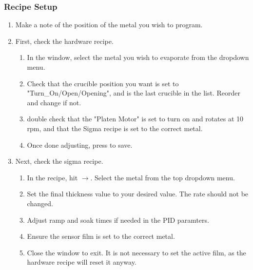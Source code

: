 \subsubsection{Recipe Setup}
\begin{enumerate}[resume]
\item Make a note of the position of the metal you wish to program.
\item First, check the hardware recipe.
\begin{enumerate}
  \item In the  window, select the metal you wish to evaporate from the dropdown menu.
  \item Check that the crucible position you want is set to "Turn\_On/Open/Opening", and is the last crucible in the list. Reorder and change if not.
  \item double check that the "Platen Motor" is set to turn on and rotates at 10 rpm, and that the Sigma recipe is set to the correct metal.
  \item Once done adjusting, press  to save.
\end{enumerate}
\item Next, check the sigma recipe.
\begin{enumerate}
  \item In the  recipe, hit $\rightarrow$. Select the metal from the top dropdown
      menu.
  \item Set the final thickness value to your desired value. The rate should not be changed.
  \item Adjust ramp and soak times if needed in the PID paramters.
  \item Ensure the sensor film is set to the correct metal.
  \item Close the window to exit. It is not necessary to set the active film, as the hardware recipe will reset it anyway.
\end{enumerate}
\end{enumerate}
